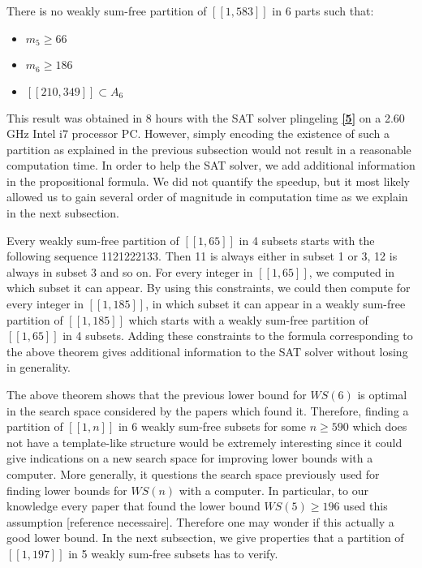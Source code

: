 \begin{computational theorem}
There is no weakly sum-free partition of \([\![1,583]\!]\) in 6 parts such that:
\begin{itemize}
	\item \(m_5 \geqslant 66\)
	\item \(m_6 \geqslant 186\)
	\item \([\![210,349]\!] \subset A_6\)
\end{itemize}
\end{computational theorem}

This result was obtained in 8 hours with the SAT solver plingeling \hyperlink{label5}{\textbf{[5]}} on a 2.60 GHz Intel
i7 processor PC.
However, simply encoding the existence of such a partition as explained in the previous subsection would not result in a
reasonable
computation time. In order to help the SAT solver, we add additional information in the propositional formula. We did
not quantify the
speedup, but it most likely allowed us to gain several order of magnitude in computation time as we explain in the next
subsection.

\par
Every weakly sum-free partition of \([\![1,65]\!]\) in 4 subsets starts with the following sequence 1121222133. Then 11
is always
either in subset 1 or 3, 12 is always in subset 3 and so on. For every integer in \([\![1,65]\!]\), we computed in which
subset it can appear.
By using this constraints, we could then compute for every integer in \([\![1,185]\!]\), in which subset it can appear
in a weakly sum-free
partition of \([\![1,185]\!]\) which starts with a weakly sum-free partition of \([\![1,65]\!]\) in 4 subsets. Adding
these constraints to the
formula corresponding to the above theorem gives additional information to the SAT solver without losing in generality.

\par
The above theorem shows that the previous lower bound for \(WS(6)\) is optimal in the search space considered by the
papers which found it.
Therefore, finding a partition of \([\![1,n]\!]\) in 6 weakly sum-free subsets for some \(n \geqslant 590\) which does
not have a template-like structure
would be extremely interesting since it could give indications on a new search space for improving lower bounds with a
computer. More generally,
it questions the search space previously used for finding lower bounds for \(WS(n)\) with a computer. In particular, to
our knowledge every paper
that found the lower bound \(WS(5) \geqslant 196\) used this assumption [reference necessaire]. Therefore one may wonder
if this actually a good lower
bound. In the next subsection, we give properties that a partition of \([\![1,197]\!]\) in 5 weakly sum-free subsets has
to verify.


